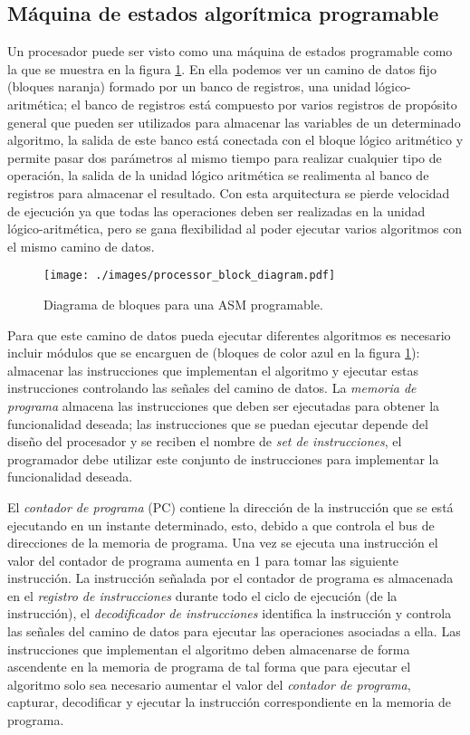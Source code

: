 \subsection{Máquina de estados algorítmica programable}

Un procesador puede ser visto como una máquina de estados programable como la que se muestra en la figura \ref{processor_block_diagram}. En ella podemos ver un camino de datos fijo (bloques naranja) formado por un banco de registros, una unidad lógico-aritmética; el banco de registros está compuesto por varios registros de propósito general que pueden ser utilizados para almacenar las variables de un determinado algoritmo, la salida de este banco está conectada con el bloque lógico aritmético y permite pasar dos parámetros al mismo tiempo para realizar cualquier tipo de operación, la salida de la unidad lógico aritmética se realimenta al banco de registros para almacenar el resultado. Con esta arquitectura se pierde velocidad de ejecución ya que todas las operaciones deben ser realizadas en la unidad lógico-aritmética, pero se gana flexibilidad al poder ejecutar varios algoritmos con el mismo camino de datos.

\begin{figure}[htpb]
  \centering
  \texttt{[image: ./images/processor\_block\_diagram.pdf]}
  \caption{Diagrama de bloques para una ASM programable.} \label{processor_block_diagram}
\end{figure}


Para que este camino de datos pueda ejecutar diferentes algoritmos es necesario incluir módulos que se encarguen de (bloques de color azul en la figura \ref{processor_block_diagram}): almacenar las instrucciones que implementan el algoritmo y ejecutar estas instrucciones controlando las señales del camino de datos. La \textit{memoria de programa} almacena las instrucciones que deben ser ejecutadas para obtener la funcionalidad deseada; las instrucciones que se puedan ejecutar depende del diseño del procesador y se reciben el nombre de \textit{set de instrucciones}, el programador debe utilizar este conjunto de instrucciones para implementar la funcionalidad deseada.

El \textit{contador de programa} (PC) contiene la dirección de la instrucción que se está ejecutando en un instante determinado, esto, debido a que controla el bus de direcciones de la memoria de programa. Una vez se ejecuta una instrucción el valor del contador de programa aumenta en 1 para tomar las siguiente instrucción. La instrucción señalada por el contador de programa es almacenada en el \textit{registro de instrucciones} durante todo el ciclo de ejecución (de la instrucción), el \textit{decodificador de instrucciones} identifica la instrucción y controla las señales del camino de datos para ejecutar las operaciones asociadas a ella. Las instrucciones que implementan el algoritmo deben almacenarse de forma ascendente en la memoria de programa de tal forma que para ejecutar el algoritmo solo sea necesario aumentar el valor del \textit{contador de programa}, capturar, decodificar y ejecutar la instrucción correspondiente en la memoria de programa.


